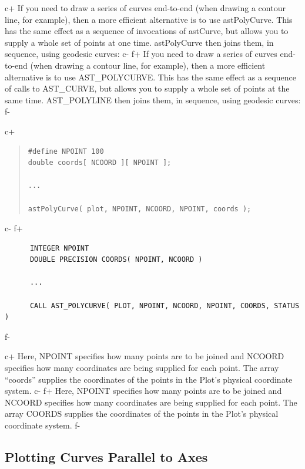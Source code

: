 \documentclass[twoside,11pt]{article}
\begin{document}
c+
If you need to draw a series of curves end-to-end (when drawing a
contour line, for example), then a more efficient alternative is to
use astPolyCurve. This has the same effect as a sequence of
invocations of astCurve, but allows you to supply a whole set of
points at one time. astPolyCurve then joins them, in sequence, using
geodesic curves:
c-
f+
If you need to draw a series of curves end-to-end (when drawing a
contour line, for example), then a more efficient alternative is to
use AST\_POLYCURVE. This has the same effect as a sequence of calls to
AST\_CURVE, but allows you to supply a whole set of points at the same
time. AST\_POLYLINE then joins them, in sequence, using geodesic
curves:
f-

c+
\begin{quote}
\small
\begin{verbatim}
#define NPOINT 100
double coords[ NCOORD ][ NPOINT ];

...

astPolyCurve( plot, NPOINT, NCOORD, NPOINT, coords );
\end{verbatim}
\normalsize
\end{quote}
c-
f+
\small
\begin{verbatim}
      INTEGER NPOINT
      DOUBLE PRECISION COORDS( NPOINT, NCOORD )

      ...

      CALL AST_POLYCURVE( PLOT, NPOINT, NCOORD, NPOINT, COORDS, STATUS )
\end{verbatim}
\normalsize
f-

c+
Here, NPOINT specifies how many points are to be joined and NCOORD
specifies how many coordinates are being supplied for each point.  The
array ``coords'' supplies the coordinates of the points in the Plot's
physical coordinate system.
c-
f+
Here, NPOINT specifies how many points are to be joined and NCOORD
specifies how many coordinates are being supplied for each point.  The
array COORDS supplies the coordinates of the points in the Plot's
physical coordinate system.
f-

\subsection{Plotting Curves Parallel to Axes}
\end{document}

